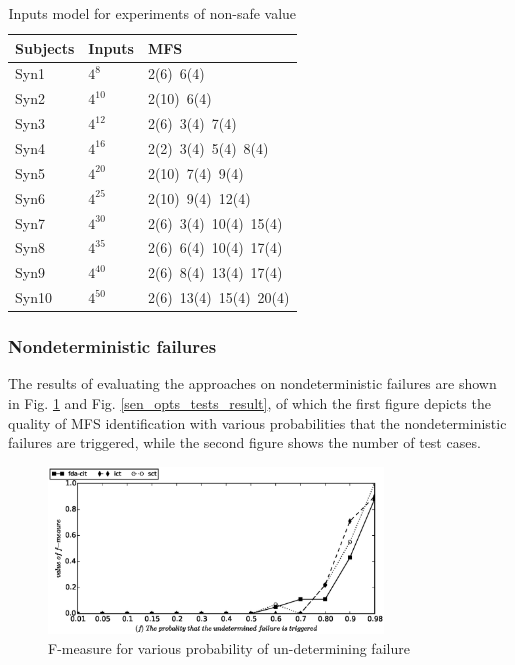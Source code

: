 \documentclass[10pt,journal,compsoc]{IEEEtran}
\begin{document}
\begin{table}[ht]
\caption{Inputs model for experiments of non-safe value}
\label{inputs_non_safe}
\centering
\begin{tabular}{l|l|l}
\hline
Subjects & Inputs & MFS \\
\hline
Syn1   &  $4^{8}$       & 2(6)\ 6(4)  \\
Syn2   &   $4^{10} $      &  2(10)\ 6(4) \\
Syn3     &   $4^{12} $      &    2(6)\ 3(4)\ 7(4)  \\
Syn4    & $4^{16}$        &  2(2)\ 3(4)\ 5(4)\ 8(4)   \\
Syn5     &  $4^{20}  $ &2(10)\ 7(4)\ 9(4) \\
Syn6   &  $4^{25}$       & 2(10)\ 9(4)\ 12(4)  \\
Syn7   &   $4^{30}$      &  2(6)\ 3(4)\ 10(4)\ 15(4) \\
Syn8     &   $4^{35} $      & 2(6)\ 6(4)\ 10(4)\ 17(4)  \\
Syn9    & $4^{40} $        &   2(6)\ 8(4)\ 13(4)\ 17(4)   \\
Syn10     &  $4^{50} $ &2(6)\ 13(4)\ 15(4)\ 20(4) \\ \hline
\end{tabular}

\end{table}

\subsubsection{Nondeterministic failures}
The results of evaluating the approaches on nondeterministic failures are shown in Fig. \ref{sen_und_f_measure_result} and Fig. \ref{sen_opts_tests_result}, of which the first figure depicts the quality of MFS identification with various probabilities that the nondeterministic failures are triggered, while the second figure shows the number of test cases.

\begin{figure}[htbp]
 \includegraphics[width=3.5in]{sen_und_f_measure.eps}
\caption{F-measure for various probability of un-determining failure}
\label{sen_und_f_measure_result}
\end{figure}
\end{document}
